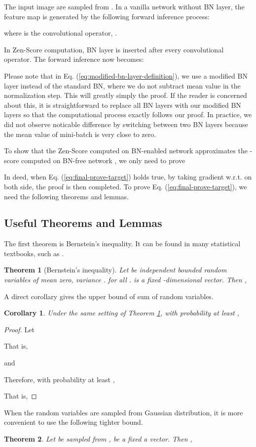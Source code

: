 \documentclass{article}
\newtheorem{thm}{Theorem}
\newtheorem{cor}{Corollary}
\begin{document}
The input image  are sampled from .
In a vanilla network without BN layer, the feature map 
is generated by the following forward inference process:

where  is the convolutional operator, . 

In Zen-Score computation, BN layer is inserted after every convolutional
operator. The forward inference now becomes:

Please note that in Eq. (\ref{eq:modified-bn-layer-definition}),
we use a modified BN layer instead of the standard BN, where we do
not subtract mean value in the normalization step. This will greatly
simply the proof. If the reader is concerned about this, it is straightforward
to replace all BN layers with our modified BN layers so that the computational
process exactly follows our proof. In practice, we did not observe
noticable difference by switching between two BN layers because the
mean value of mini-batch is very close to zero.

To show that the Zen-Score computed on BN-enabled network 
approximates the -score computed on BN-free network ,
we only need to prove 

In deed, when Eq. (\ref{eq:final-prove-target}) holds true, by taking
gradient w.r.t.  on both side, the proof is then
completed. To prove Eq. (\ref{eq:final-prove-target}), we need the
following theorems and lemmas.

\subsection{Useful Theorems and Lemmas}

The first theorem is Bernstein's inequality. It can be found in many
statistical textbooks, such as \cite[Theorem 2.8.1]{vershynin_2018}.
\begin{thm}[Bernstein's inequality]
\label{thm:Bernstein-inequality} Let 
be independent bounded random variables of mean zero, variance .
 for all . 
is a fixed -dimensional vector. Then , 


\end{thm}

A direct corollary gives the upper bound of sum of random variables.
\begin{cor}
\label{cor:bernstein-upper-bound} Under the same setting of Theorem
\ref{thm:Bernstein-inequality}, with probability at least ,

\end{cor}

\begin{proof}
Let 

That is,

and

Therefore, with probability at least ,


That is,

\end{proof}
When the random variables are sampled from Gaussian distribution,
it is more convenient to use the following tighter bound.
\begin{thm}
\label{thm:sum-gaussian-tail} Let  be
sampled from , 
be a fixed a vector. Then , 

\end{thm}
\end{document}

